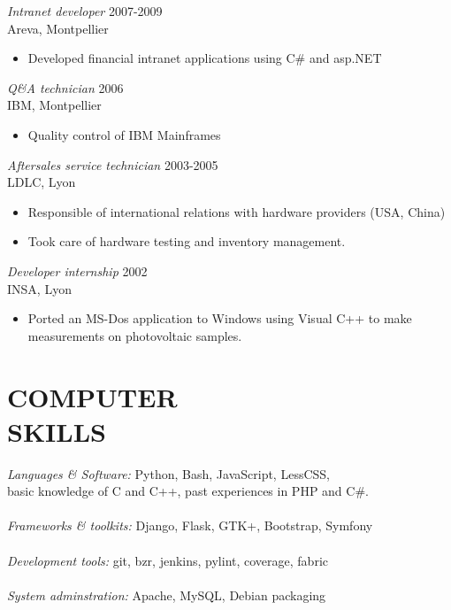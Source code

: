 \documentclass[margin]{res}
\begin{document}
\begin{resume}
		{\sl Intranet developer} \hfill     2007-2009 \\
		Areva, Montpellier
		\begin{itemize}  \itemsep -2pt
			\item  Developed financial intranet applications using C\# and asp.NET
		\end{itemize}
		
		{\sl Q\&A technician} \hfill     2006 \\
		IBM, Montpellier
		\begin{itemize}  \itemsep -2pt
			\item  Quality control of IBM Mainframes
		\end{itemize}

		{\sl Aftersales service technician} \hfill     2003-2005 \\
		LDLC, Lyon
		\begin{itemize}  \itemsep -2pt
			\item  Responsible of international relations with hardware providers (USA, China)
			\item Took care of hardware testing and inventory management.
		\end{itemize}

		{\sl Developer internship} \hfill   2002 \\
		INSA, Lyon
		\begin{itemize}  \itemsep -2pt
			\item  Ported an MS-Dos application to Windows using Visual C++ to make 
			measurements on photovoltaic samples.
		\end{itemize}


\section{COMPUTER \\ SKILLS} {\sl Languages \& Software:} Python, Bash, JavaScript, LessCSS, \\
		basic knowledge of C and C++,  past experiences in PHP and C\#.\\ \\
		{\sl Frameworks \& toolkits:} Django, Flask, GTK+, Bootstrap, Symfony\\ \\
                	{\sl Development tools:} git, bzr, jenkins, pylint, coverage, fabric\\ \\
		{\sl System adminstration:} Apache, MySQL, Debian packaging



\end{resume}
\end{document}
